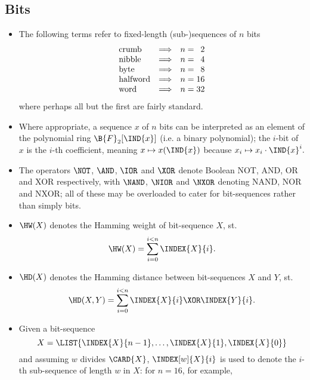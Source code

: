 
\subsection{Bits}

\begin{itemize}

\item The following terms refer to fixed-length (sub-)sequences of $n$ bits
      \[
      \begin{array}{lcc@{\;}c@{\;}r}
      \mbox{crumb}    &\Longrightarrow& n &=&  2 \\
      \mbox{nibble}   &\Longrightarrow& n &=&  4 \\
      \mbox{byte}     &\Longrightarrow& n &=&  8 \\
      \mbox{halfword} &\Longrightarrow& n &=& 16 \\
      \mbox    {word} &\Longrightarrow& n &=& 32 \\
      \end{array}
      \]
      where perhaps all but the first are fairly standard.
\item Where appropriate, a sequence $x$ of $n$ bits can be interpreted as an
      element of the polynomial ring $\B{F}_2[\IND{x}]$
      (i.e. a binary polynomial);
      the $i$-bit of $x$ is the $i$-th coefficient, meaning
      $
      x \mapsto x( \IND{x} )
      $
      because
      $
      x_i \mapsto x_i \cdot \IND{x}^i .
      $
\item The operators $\NOT$, $\AND$, $\IOR$ and $\XOR$ denote Boolean NOT, AND,
      OR and XOR respectively, with $\NAND$, $\NIOR$ and $\NXOR$ denoting NAND,
      NOR and NXOR; all of these may be overloaded to cater for bit-sequences
      rather than simply bits.
\item $\HW( X )$
      denotes the Hamming weight   of      bit-sequence  $X$,         st.
      \[
      \HW( X )    = \sum_{i=0}^{i<n} \INDEX{X}{i}                   .
      \]
\item $\HD( X )$
      denotes the Hamming distance between bit-sequences $X$ and $Y$, st.
      \[
      \HD( X, Y ) = \sum_{i=0}^{i<n} \INDEX{X}{i} \XOR \INDEX{Y}{i} .
      \]
\item Given a bit-sequence
      \[
      X = \LIST{ \INDEX{X}{n-1}, \ldots, \INDEX{X}{1}, \INDEX{X}{0} } 
      \]
      and assuming $w$ divides $\CARD{X}$, $\INDEX[w]{X}{i}$ is used to denote 
      the $i$-th sub-sequence of length $w$ in $X$: for $n = 16$, for example, 

\end{itemize}
